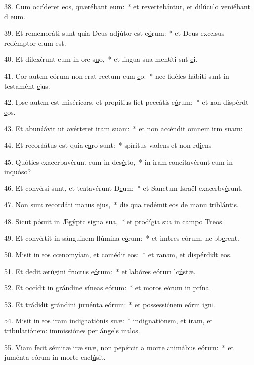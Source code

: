 38. Cum occíderet eos, quærébant \uline{e}um:~* et revertebántur, et dilúculo veniébant d \uline{e}um.\par 
39. Et rememoráti sunt quia Deus adjútor est e\uline{ó}rum:~* et Deus excélsus redémptor er\uline{u}m est.\par 
40. Et dilexérunt eum in ore s\uline{u}o,~* et lingua sua mentíti snt \uline{e}i.\par 
41. Cor autem eórum non erat rectum cum \uline{e}o:~* nec fidéles hábiti sunt in testamént \uline{e}jus.\par 
42. Ipse autem est miséricors, et propítius fiet peccátis e\uline{ó}rum:~* et non dispérdt \uline{e}os.\par 
43. Et abundávit ut avérteret iram s\uline{u}am:~* et non accéndit omnem irm s\uline{u}am:\par 
44. Et recordátus est quia c\uline{a}ro sunt:~* spíritus vadens et non rd\uline{i}ens.\par 
45. Quóties exacerbavérunt eum in des\uline{é}rto,~* in iram concitavérunt eum in in\uline{quó}so?\par 
46. Et convérsi sunt, et tentavérunt D\uline{e}um:~* et Sanctum Israël exacerbv\uline{é}runt.\par 
47. Non sunt recordáti manus \uline{e}jus,~* die qua redémit eos de manu tribl\uline{á}ntis.\par 
48. Sicut pósuit in Ægýpto signa s\uline{u}a,~* et prodígia sua in campo Tn\uline{e}os.\par 
49. Et convértit in sánguinem flúmina e\uline{ó}rum:~* et imbres eórum, ne bb\uline{e}rent.\par 
50. Misit in eos cœnomyíam, et comédit \uline{e}os:~* et ranam, et dispérdidt \uline{e}os.\par 
51. Et dedit ærúgini fructus e\uline{ó}rum:~* et labóres eórum lc\uline{ú}stæ.\par 
52. Et occídit in grándine víneas e\uline{ó}rum:~* et moros eórum in pr\uline{í}na.\par 
53. Et trádidit grándini juménta e\uline{ó}rum:~* et possessiónem eórm \uline{i}gni.\par 
54. Misit in eos iram indignatiónis s\uline{u}æ:~* indignatiónem, et iram, et tribulatiónem: immissiónes per ángels m\uline{a}los.\par 
55. Viam fecit sémitæ iræ suæ, non pepércit a morte animábus e\uline{ó}rum:~* et juménta eórum in morte cncl\uline{ú}sit.\par 
